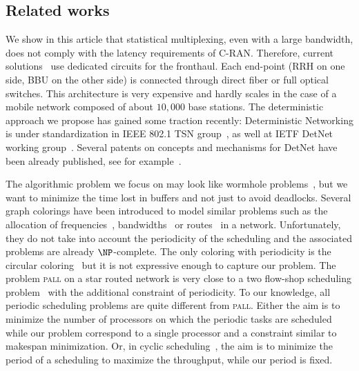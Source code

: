 \documentclass[a4paper,10pt]{article}
\newcommand\pall{\textsc{pall}\xspace}
\begin{document}
 \subsection*{Related works}

  We show in this article that statistical multiplexing, even with a large bandwidth, does not comply with the latency requirements of C-RAN. Therefore, current solutions~\cite{pizzinat2015things,tayq2017real}  use dedicated circuits for the fronthaul. Each end-point (RRH on one side, BBU on the other side) is connected through direct fiber or full optical switches. This architecture is very expensive and hardly scales in the case of a mobile network composed of about $10,000$ base stations. The deterministic approach we propose has gained some traction recently: Deterministic Networking is under standardization in IEEE 802.1 TSN group~\cite{finn-detnet-architecture-08}, as well at IETF DetNet working group~\cite{ieee802}. Several patents on concepts and mechanisms for DetNet have been already published, see for example~\cite{howe2005time,leclerc2016transmission}. 
     
The algorithmic problem we focus on may look like wormhole problems~\cite{cole1996benefit}, but we want to minimize the time lost in buffers and not just to avoid deadlocks. Several graph colorings have been introduced to model similar problems such as the allocation of frequencies~\cite{borndorfer1998frequency}, bandwidths~\cite{erlebach2001complexity} or routes~\cite{cole1996benefit} in a network. Unfortunately, they do not take into account the periodicity of the scheduling and the associated problems are already $\NP$-complete. The only coloring with periodicity is the circular coloring~\cite{zhou2013multiple} but it is not expressive enough to capture our problem. 
The problem \pall on a star routed network is very close to a two flow-shop scheduling problem~\cite{yu2004minimizing} with the additional constraint of periodicity. To our knowledge, all periodic scheduling problems are quite different from \pall. 
Either the aim is to minimize the number of processors on which the periodic tasks are scheduled~\cite{korst1991periodic,hanen1993cyclic} while our problem correspond to a single processor and a constraint similar to makespan minimization. Or, in cyclic scheduling~\cite{levner2010complexity}, the aim is to minimize the period of a scheduling to maximize the throughput, while our period is fixed. 
\end{document}
